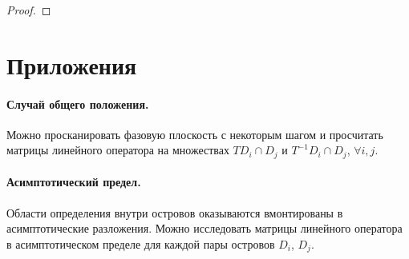 \documentclass{article}
\begin{document}
\begin{proof}
	
\end{proof}

\section*{Приложения}

\paragraph{Случай общего положения.} 

Можно просканировать фазовую плоскость с некоторым шагом и просчитать матрицы линейного оператора на множествах $T D_i \cap D_j$ и $T^{-1} D_i \cap D_j$, $\forall i, j$.

\paragraph{Асимптотический предел.}

Области определения внутри островов оказываются вмонтированы в асимптотические разложения.
Можно исследовать матрицы линейного оператора в асимптотическом пределе для каждой пары островов $D_i$, $D_j$.
\end{document}
